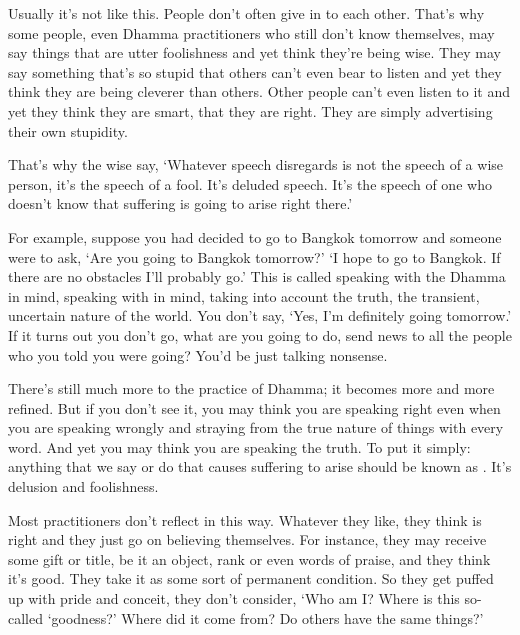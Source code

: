 Usually it's not like this. People don't often give in to each other. That's why some people, even Dhamma practitioners who still don't know themselves, may say things that are utter foolishness and yet think they're being wise. They may say something that's so stupid that others can't even bear to listen and yet they think they are being cleverer than others. Other people can't even listen to it and yet they think they are smart, that they are right. They are simply advertising their own stupidity. 

That's why the wise say, `Whatever speech disregards  is not the speech of a wise person, it's the speech of a fool. It's deluded speech. It's the speech of one who doesn't know that suffering is going to arise right there.' 

For example, suppose you had decided to go to Bangkok tomorrow and someone were to ask, `Are you going to Bangkok tomorrow?' `I hope to go to Bangkok. If there are no obstacles I'll probably go.' This is called speaking with the Dhamma in mind, speaking with  in mind, taking into account the truth, the transient, uncertain nature of the world. You don't say, `Yes, I'm definitely going tomorrow.' If it turns out you don't go, what are you going to do, send news to all the people who you told you were going? You'd be just talking nonsense. 

There's still much more to the practice of Dhamma; it becomes more and more refined. But if you don't see it, you may think you are speaking right even when you are speaking wrongly and straying from the true nature of things with every word. And yet you may think you are speaking the truth. To put it simply: anything that we say or do that causes suffering to arise should be known as . It's delusion and foolishness. 

Most practitioners don't reflect in this way. Whatever they like, they think is right and they just go on believing themselves. For instance, they may receive some gift or title, be it an object, rank or even words of praise, and they think it's good. They take it as some sort of permanent condition. So they get puffed up with pride and conceit, they don't consider, `Who am I? Where is this so-called `goodness?' Where did it come from? Do others have the same things?' 

